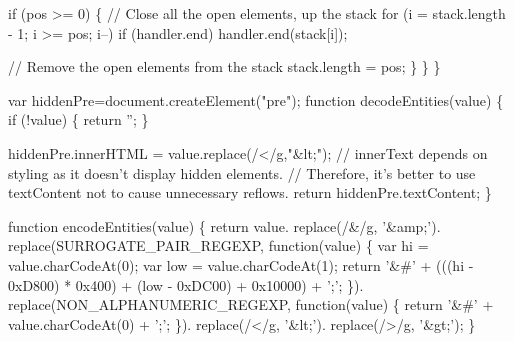 \begin{DoxyCodeInclude}
    \textcolor{keywordflow}{if} (pos >= 0) \{
      \textcolor{comment}{// Close all the open elements, up the stack}
      \textcolor{keywordflow}{for} (i = stack.length - 1; i >= pos; i--)
        \textcolor{keywordflow}{if} (handler.end) handler.end(stack[i]);

      \textcolor{comment}{// Remove the open elements from the stack}
      stack.length = pos;
    \}
  \}
\}

var hiddenPre=document.createElement(\textcolor{stringliteral}{"pre"});
\textcolor{keyword}{function} decodeEntities(value) \{
  \textcolor{keywordflow}{if} (!value) \{ \textcolor{keywordflow}{return} \textcolor{stringliteral}{''}; \}

  hiddenPre.innerHTML = value.replace(/</g,\textcolor{stringliteral}{"&lt;"});
  \textcolor{comment}{// innerText depends on styling as it doesn't display hidden elements.}
  \textcolor{comment}{// Therefore, it's better to use textContent not to cause unnecessary reflows.}
  \textcolor{keywordflow}{return} hiddenPre.textContent;
\}

\textcolor{keyword}{function} encodeEntities(value) \{
  \textcolor{keywordflow}{return} value.
    replace(/&/g, \textcolor{stringliteral}{'&amp;'}).
    replace(SURROGATE\_PAIR\_REGEXP, \textcolor{keyword}{function}(value) \{
      var hi = value.charCodeAt(0);
      var low = value.charCodeAt(1);
      \textcolor{keywordflow}{return} \textcolor{stringliteral}{'&#'} + (((hi - 0xD800) * 0x400) + (low - 0xDC00) + 0x10000) + \textcolor{charliteral}{';'};
    \}).
    replace(NON\_ALPHANUMERIC\_REGEXP, \textcolor{keyword}{function}(value) \{
      \textcolor{keywordflow}{return} \textcolor{stringliteral}{'&#'} + value.charCodeAt(0) + \textcolor{charliteral}{';'};
    \}).
    replace(/</g, \textcolor{stringliteral}{'&lt;'}).
    replace(/>/g, \textcolor{stringliteral}{'&gt;'});
\}


\end{DoxyCodeInclude}
